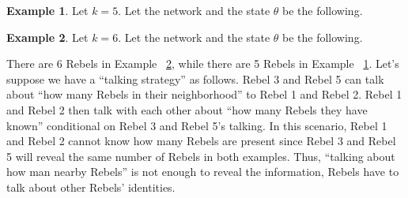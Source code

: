 \documentclass[12pt,letterpaper]{article}
\theoremstyle{definition}
\newtheorem{example}{Example}[section]
\theoremstyle{remark}
\theoremstyle{claim}
\begin{document}
\begin{example}\label{ex_cycle_number_5}
Let $k=5$. Let the network and the state $\theta$ be the following.

\begin{center} 
\end{center} 

\end{example}


\begin{example}\label{ex_cycle_number_6}
Let $k=6$. Let the network and the state $\theta$ be the following.
\begin{center} 
\end{center} 


\end{example}

There are 6 Rebels in Example ~\ref{ex_cycle_number_6}, while there are 5 Rebels in Example ~\ref{ex_cycle_number_5}. Let's suppose we have a ``talking strategy'' as follows. Rebel 3 and Rebel 5 can talk about ``how many Rebels in their neighborhood'' to Rebel 1 and Rebel 2. Rebel 1 and Rebel 2 then talk with each other about ``how many Rebels they have known'' conditional on Rebel 3 and Rebel 5's talking. In this scenario, Rebel 1 and Rebel 2 cannot know how many Rebels are present since Rebel 3 and Rebel 5 will reveal the same number of Rebels in both examples. Thus, ``talking about how man nearby Rebels'' is not enough to reveal the information, Rebels have to talk about other Rebels' identities. 
\end{document}
